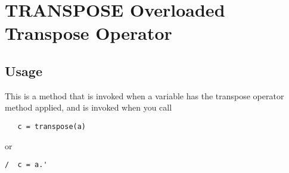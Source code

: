 \section{TRANSPOSE Overloaded Transpose Operator}

\subsection{Usage}

This is a method that is invoked when a variable has the
transpose operator method applied, and is invoked
when you call
\begin{verbatim}
   c = transpose(a)
\end{verbatim}
or
\begin{verbatim}
/  c = a.'
\end{verbatim}
